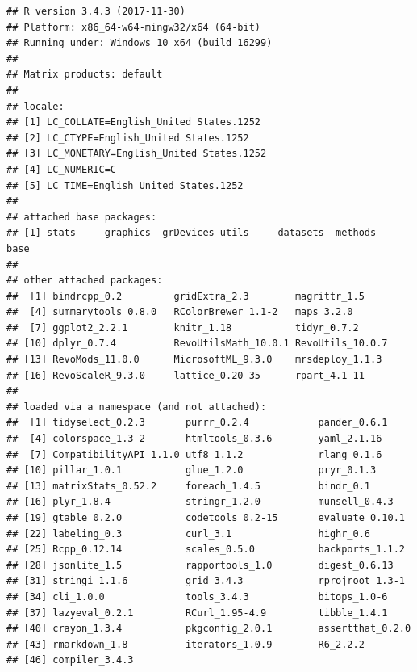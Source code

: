 \documentclass[]{article}
\begin{document}
\begin{verbatim}
## R version 3.4.3 (2017-11-30)
## Platform: x86_64-w64-mingw32/x64 (64-bit)
## Running under: Windows 10 x64 (build 16299)
## 
## Matrix products: default
## 
## locale:
## [1] LC_COLLATE=English_United States.1252 
## [2] LC_CTYPE=English_United States.1252   
## [3] LC_MONETARY=English_United States.1252
## [4] LC_NUMERIC=C                          
## [5] LC_TIME=English_United States.1252    
## 
## attached base packages:
## [1] stats     graphics  grDevices utils     datasets  methods   base     
## 
## other attached packages:
##  [1] bindrcpp_0.2         gridExtra_2.3        magrittr_1.5        
##  [4] summarytools_0.8.0   RColorBrewer_1.1-2   maps_3.2.0          
##  [7] ggplot2_2.2.1        knitr_1.18           tidyr_0.7.2         
## [10] dplyr_0.7.4          RevoUtilsMath_10.0.1 RevoUtils_10.0.7    
## [13] RevoMods_11.0.0      MicrosoftML_9.3.0    mrsdeploy_1.1.3     
## [16] RevoScaleR_9.3.0     lattice_0.20-35      rpart_4.1-11        
## 
## loaded via a namespace (and not attached):
##  [1] tidyselect_0.2.3       purrr_0.2.4            pander_0.6.1          
##  [4] colorspace_1.3-2       htmltools_0.3.6        yaml_2.1.16           
##  [7] CompatibilityAPI_1.1.0 utf8_1.1.2             rlang_0.1.6           
## [10] pillar_1.0.1           glue_1.2.0             pryr_0.1.3            
## [13] matrixStats_0.52.2     foreach_1.4.5          bindr_0.1             
## [16] plyr_1.8.4             stringr_1.2.0          munsell_0.4.3         
## [19] gtable_0.2.0           codetools_0.2-15       evaluate_0.10.1       
## [22] labeling_0.3           curl_3.1               highr_0.6             
## [25] Rcpp_0.12.14           scales_0.5.0           backports_1.1.2       
## [28] jsonlite_1.5           rapportools_1.0        digest_0.6.13         
## [31] stringi_1.1.6          grid_3.4.3             rprojroot_1.3-1       
## [34] cli_1.0.0              tools_3.4.3            bitops_1.0-6          
## [37] lazyeval_0.2.1         RCurl_1.95-4.9         tibble_1.4.1          
## [40] crayon_1.3.4           pkgconfig_2.0.1        assertthat_0.2.0      
## [43] rmarkdown_1.8          iterators_1.0.9        R6_2.2.2              
## [46] compiler_3.4.3
\end{verbatim}
\end{document}
